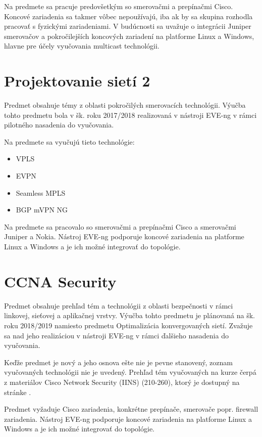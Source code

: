 Na predmete sa pracuje predovšetkým so smerovačmi a prepínačmi Cisco. Koncové zariadenia sa takmer vôbec nepoužívajú, iba ak by sa skupina rozhodla pracovať s fyzickými zariadeniami. V budúcnosti sa uvažuje o integrácii Juniper smerovačov a pokročilejších koncových zariadení na platforme Linux a Windows, hlavne pre účely vyučovania multicast technológii.



\section{Projektovanie sietí 2}

Predmet obsahuje témy z oblasti pokročilých smerovacích technológii. Výučba tohto predmetu bola v šk. roku 2017/2018 realizovaná v nástroji EVE-ng v rámci pilotného nasadenia do vyučovania.

Na predmete sa vyučujú tieto technológie:

\begin{itemize}
    \item VPLS
    \item EVPN
    \item Seamless MPLS
    \item BGP mVPN NG
\end{itemize}

Na predmete sa pracovalo so smerovačmi a prepínačmi Cisco a smerovačmi Juniper a Nokia. Nástroj EVE-ng podporuje koncové zariadenia na platforme Linux a Windows a je ich možné integrovať do topológie.




\section{CCNA Security}
  
Predmet obsahuje prehľad tém a technológii z oblasti bezpečnosti v rámci linkovej, sieťovej a aplikačnej vrstvy. Výučba tohto predmetu je plánovaná na šk. roku 2018/2019 namiesto predmetu Optimalizácia konvergovaných sietí. Zvažuje sa nad jeho realizáciou v nástroji EVE-ng v rámci ďalšieho nasadenia do vyučovania.

Keďže predmet je nový a jeho osnova ešte nie je pevne stanovený, zoznam vyučovaných technológii nie je uvedený. Prehľad tém vyučovaných na kurze čerpá z materiálov Cisco Network Security (IINS) (210-260), ktorý je dostupný na stránke \cite{ccna_security_topics}.

Predmet vyžaduje Cisco zariadenia, konkrétne prepínače, smerovače popr. firewall zariadenia. Nástroj EVE-ng podporuje koncové zariadenia na platforme Linux a Windows a je ich možné integrovať do topológie.





